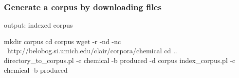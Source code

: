 \subsubsection{Generate a corpus by downloading files}

\begin{boxedverbatim}

 output: indexed corpus

 mkdir corpus
 cd corpus
 wget -r -nd -nc \
   http://belobog.si.umich.edu/clair/corpora/chemical
 cd ..
 directory_to_corpus.pl -c chemical -b produced -d corpus
 index_corpus.pl -c chemical -b produced

\end{boxedverbatim}
